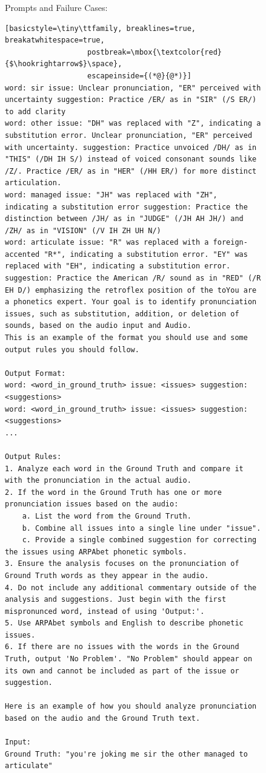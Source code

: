\documentclass[11pt]{article}
\begin{document}
\begin{figure}[ht]
\begin{AIBox}{Prompts and Failure Cases:}
\begin{minipage}[t]{\textwidth}
\begin{lstlisting}[basicstyle=\tiny\ttfamily, breaklines=true, breakatwhitespace=true,
                   postbreak=\mbox{\textcolor{red}{$\hookrightarrow$}\space},
                   escapeinside={(*@}{@*)}]
word: sir issue: Unclear pronunciation, "ER" perceived with uncertainty suggestion: Practice /ER/ as in "SIR" (/S ER/) to add clarity
word: other issue: "DH" was replaced with "Z", indicating a substitution error. Unclear pronunciation, "ER" perceived with uncertainty. suggestion: Practice unvoiced /DH/ as in "THIS" (/DH IH S/) instead of voiced consonant sounds like /Z/. Practice /ER/ as in "HER" (/HH ER/) for more distinct articulation.
word: managed issue: "JH" was replaced with "ZH", indicating a substitution error suggestion: Practice the distinction between /JH/ as in "JUDGE" (/JH AH JH/) and /ZH/ as in "VISION" (/V IH ZH UH N/)
word: articulate issue: "R" was replaced with a foreign-accented "R*", indicating a substitution error. "EY" was replaced with "EH", indicating a substitution error. suggestion: Practice the American /R/ sound as in "RED" (/R EH D/) emphasizing the retroflex position of the toYou are a phonetics expert. Your goal is to identify pronunciation issues, such as substitution, addition, or deletion of sounds, based on the audio input and Audio.
This is an example of the format you should use and some output rules you should follow. 
    
Output Format:
word: <word_in_ground_truth> issue: <issues> suggestion: <suggestions>
word: <word_in_ground_truth> issue: <issues> suggestion: <suggestions>
...
    
Output Rules:
1. Analyze each word in the Ground Truth and compare it with the pronunciation in the actual audio.
2. If the word in the Ground Truth has one or more pronunciation issues based on the audio:
    a. List the word from the Ground Truth.
    b. Combine all issues into a single line under "issue".
    c. Provide a single combined suggestion for correcting the issues using ARPAbet phonetic symbols.
3. Ensure the analysis focuses on the pronunciation of Ground Truth words as they appear in the audio.
4. Do not include any additional commentary outside of the analysis and suggestions. Just begin with the first mispronunced word, instead of using 'Output:'.
5. Use ARPAbet symbols and English to describe phonetic issues. 
6. If there are no issues with the words in the Ground Truth, output 'No Problem'. "No Problem" should appear on its own and cannot be included as part of the issue or suggestion.

Here is an example of how you should analyze pronunciation based on the audio and the Ground Truth text. 
    
Input:
Ground Truth: "you're joking me sir the other managed to articulate"


\end{lstlisting}
\end{minipage}
\end{AIBox}
\end{figure}
\end{document}
